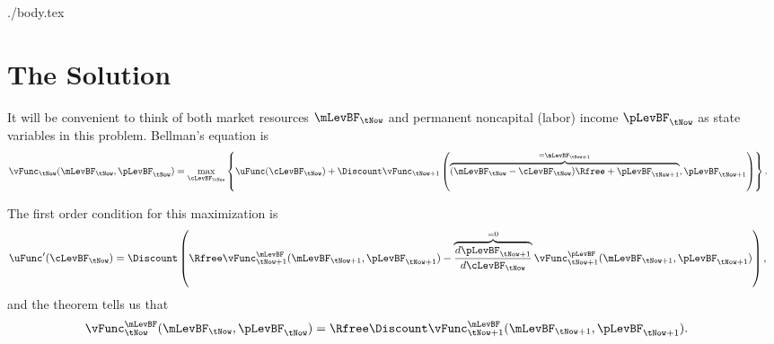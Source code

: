 \documentclass{handout}
\begin{document}
\begin{verbatimwrite}{./body.tex}
\section{The Solution}

It will be convenient to think of both market resources $\mLevBF_{\tNow}$ and permanent noncapital (labor) income $\pLevBF_{\tNow}$ 
as state variables in this problem.  Bellman's equation is 
\begin{equation}\begin{gathered}\begin{aligned}
        \vFunc_{\tNow}(\mLevBF_{\tNow},\pLevBF_{\tNow}) & =  \max_{\cLevBF_{\tNow}} \left\{ \uFunc(\cLevBF_{\tNow}) + \Discount \vFunc_{\tNow+1}\left(\overbrace{(\mLevBF_{\tNow}-\cLevBF_{\tNow})\Rfree+\pLevBF_{\tNow+1}}^{=\mLevBF_{\tNow+1}},\pLevBF_{\tNow+1}\right)\right\}.
        \label{eq:vmax}
\end{aligned}\end{gathered}\end{equation}

The first order condition for this maximization is
\begin{equation}\begin{gathered}\begin{aligned}
        \uFunc^{\prime}(\cLevBF_{\tNow}) & =  \Discount \left(\Rfree \vFunc_{\tNow+1}^{\mLevBF}(\mLevBF_{\tNow+1},\pLevBF_{\tNow+1})-\overbrace{\frac{d\pLevBF_{\tNow+1}}{d \cLevBF_{\tNow}}}^{=0}\vFunc_{\tNow+1}^{\pLevBF}(\mLevBF_{\tNow+1},\pLevBF_{\tNow+1})\right), \label{eq:upeqrbv}
\end{aligned}\end{gathered}\end{equation}
and the  theorem tells us that
\begin{equation}\begin{gathered}\begin{aligned}
        \vFunc_{\tNow}^{\mLevBF}(\mLevBF_{\tNow},\pLevBF_{\tNow}) & =  \Rfree \Discount \vFunc_{\tNow+1}^{\mLevBF}(\mLevBF_{\tNow+1},\pLevBF_{\tNow+1}). \label{eq:vpeqrbv}
\end{aligned}\end{gathered}\end{equation}


\end{verbatimwrite}
\end{document}
